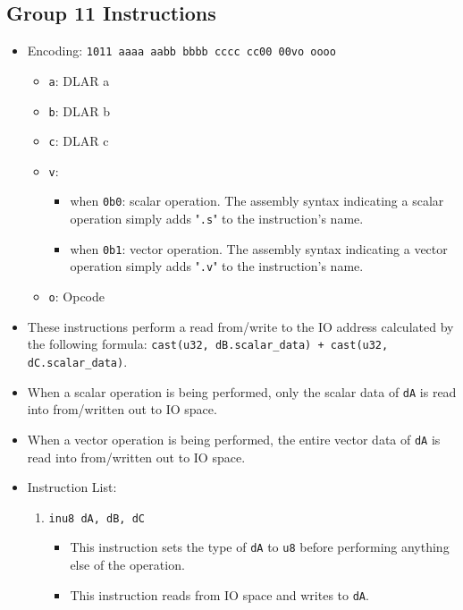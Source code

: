 \documentclass{article}
\begin{document}
	\subsection{Group 11 Instructions}
		\begin{itemize}
		\item Encoding: \texttt{1011 aaaa aabb bbbb  cccc cc00 00vo oooo}
			\begin{itemize}
			\item \texttt{a}: DLAR a
			\item \texttt{b}: DLAR b
			\item \texttt{c}: DLAR c
			\item \texttt{v}:
				\begin{itemize}
				\item when \texttt{0b0}: scalar operation. The assembly
					syntax indicating a scalar operation simply adds
					"\texttt{.s}" to the instruction's name.
				\item when \texttt{0b1}: vector operation. The assembly
					syntax indicating a vector operation simply adds
					"\texttt{.v}" to the instruction's name.
				\end{itemize}
			\item \texttt{o}: Opcode
			\end{itemize}
		\item These instructions perform a read from/write to the IO
			address calculated by the following formula:
			\texttt{cast(u32, dB.scalar\_data)
				+ cast(u32, dC.scalar\_data)}.
		\item When a scalar operation is being performed, only the
			scalar data of \texttt{dA} is read into from/written out to IO
			space.
		\item When a vector operation is being performed, the
			entire vector data of \texttt{dA} is read into from/written out
			to IO space.
		\item Instruction List:
			\begin{enumerate}
			\item \texttt{inu8 dA, dB, dC}
				\begin{itemize}
				\item This instruction sets the type of \texttt{dA} to
					\texttt{u8} before performing anything else of the
					operation.
				\item This instruction reads from IO space and writes to
					\texttt{dA}.
				\end{itemize}

\end{enumerate}
\end{itemize}
\end{document}
